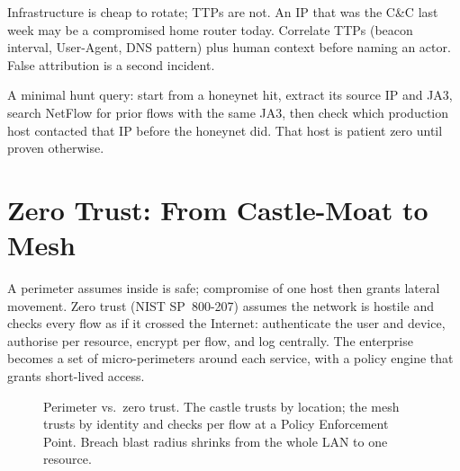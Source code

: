 \begin{remark}\label{rem:attr}
Infrastructure is cheap to rotate; TTPs are not. An IP that was the C\&C last week may be a compromised home router today. Correlate TTPs (beacon interval, User-Agent, DNS pattern) plus human context before naming an actor. False attribution is a second incident.
\end{remark}

A minimal hunt query: start from a honeynet hit, extract its source IP and JA3, search NetFlow for prior flows with the same JA3, then check which production host contacted that IP before the honeynet did. That host is patient zero until proven otherwise.

\section{Zero Trust: From Castle-Moat to Mesh}\label{sec:zerotrust}
A perimeter assumes inside is safe; compromise of one host then grants lateral movement. Zero trust (NIST SP~800-207) assumes the network is hostile and checks every flow as if it crossed the Internet: authenticate the user and device, authorise per resource, encrypt per flow, and log centrally. The enterprise becomes a set of micro-perimeters around each service, with a policy engine that grants short-lived access.

\begin{figure}[h]\centering
{}%
\caption{Perimeter vs.\ zero trust. The castle trusts by location; the mesh trusts by identity and checks per flow at a Policy Enforcement Point. Breach blast radius shrinks from the whole LAN to one resource.}
\label{fig:zerotrust}
\end{figure}

